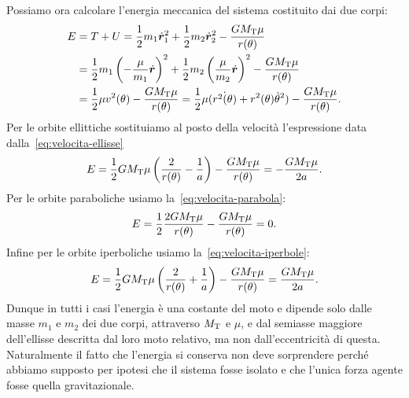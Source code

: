 {Possiamo ora calcolare l'energia meccanica del sistema costituito dai due corpi:
\begin{equation}
  \label{eq:energia}
  \begin{split}
    E &= T + U = \frac{1}{2}m_1\dot{\bm{r}}_1^2 + \frac{1}{2}m_2\dot{\bm{r}}_2^2
    - \frac{GM_\textup{T}\mu}{r(\theta)} \\
    &= \frac{1}{2}m_1
    \left(
      -\frac{\mu}{m_1}\dot{\bm{r}}
    \right)^2 + \frac{1}{2}m_2
    \left(
      \frac{\mu}{m_2}\dot{\bm{r}}
    \right)^2 - \frac{GM_\textup{T}\mu}{r(\theta)} \\
    &= \frac{1}{2}\mu v^2(\theta)
    - \frac{GM_\textup{T}\mu}{r(\theta)} = \frac{1}{2}\mu(\dot{r^2(\theta)} +
    r^2(\theta)\dot{\theta}^2) - \frac{GM_\textup{T}\mu}{r(\theta)}.
  \end{split}
\end{equation}
Per le orbite ellittiche sostituiamo al posto della velocità l'espressione data
dalla~\eqref{eq:velocita-ellisse}
\begin{equation}
  \label{eq:energia-ellisse}
  E = \frac{1}{2}GM_\textup{T}\mu
  \left(
    \frac{2}{r(\theta)} - \frac{1}{a}
  \right) - \frac{GM_\textup{T}\mu}{r(\theta)} = -\frac{GM_\textup{T}\mu}{2a}.
\end{equation}
Per le orbite paraboliche usiamo la~\eqref{eq:velocita-parabola}:
\begin{equation}
  E = \frac{1}{2}\frac{2GM_\textup{T}\mu}{r(\theta)} -
  \frac{GM_\textup{T}\mu}{r(\theta)} = 0.
\end{equation}
Infine per le orbite iperboliche usiamo la~\eqref{eq:velocita-iperbole}:
\begin{equation}
    \label{eq:energia-iperbole}
  E = \frac{1}{2}GM_\textup{T}\mu
  \left(
    \frac{2}{r(\theta)} + \frac{1}{a}
  \right) - \frac{GM_\textup{T}\mu}{r(\theta)} = \frac{GM_\textup{T}\mu}{2a}.
\end{equation}
Dunque in tutti i casi l'energia è una costante del moto e dipende solo dalle
masse $m_1$ e $m_2$ dei due corpi, attraverso $M_\textup{T}$ e $\mu$, e dal
semiasse maggiore dell'ellisse descritta dal loro moto relativo, ma non
dall'eccentricità di questa. Naturalmente il fatto che l'energia si conserva non
deve sorprendere perché abbiamo supposto per ipotesi che il sistema fosse
isolato e che l'unica forza agente fosse quella
gravitazionale.

}
